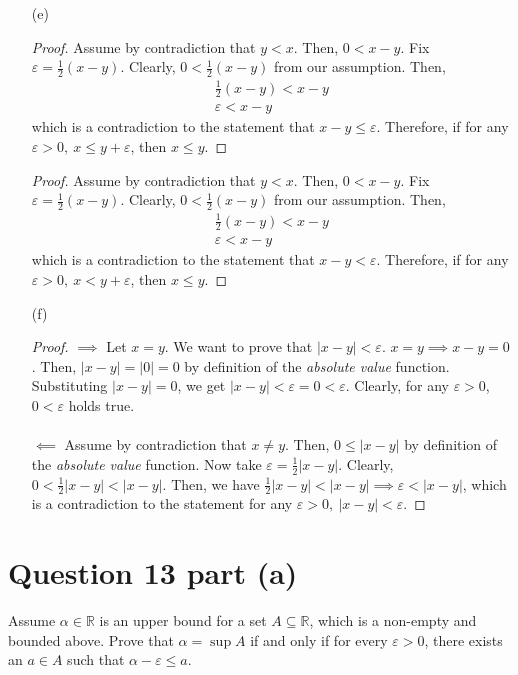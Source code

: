 \documentclass[13pt]{article}
\begin{document}
\begin{enumerate}
\item [(e)]
  \begin{proof}
    Assume by contradiction that $y < x$. Then, $0 < x - y$. Fix $\varepsilon = \frac{1}{2}(x - y)$.
    Clearly, $0 < \frac{1}{2}(x - y)$ from our assumption. Then,
    \begin{align*}
      \frac{1}{2}(x - y) < x - y \\
      \varepsilon < x - y
    \end{align*}
    which is a contradiction to the statement that $x - y \leq \varepsilon$. Therefore, if for any
    $\varepsilon > 0, \ x \leq y + \varepsilon$, then $x \leq y$.
  \end{proof}
  \begin{proof}
    Assume by contradiction that $y < x$. Then, $0 < x - y$. Fix $\varepsilon = \frac{1}{2}(x - y)$.
    Clearly, $0 < \frac{1}{2}(x - y)$ from our assumption. Then,
    \begin{align*}
      \frac{1}{2}(x - y) < x - y \\
      \varepsilon < x - y
    \end{align*}
    which is a contradiction to the statement that $x - y < \varepsilon$. Therefore, if for any
    $\varepsilon > 0, \ x < y + \varepsilon$, then $x \leq y$.
  \end{proof}

\item [(f)]
  \begin{proof}
    $\implies$ Let $x = y$. We want to prove that $|x - y| < \varepsilon$. $x = y \implies x - y = 0$.
    Then, $|x - y| = |0| = 0$ by definition of the \textit{absolute value} function. Substituting $|x - y| = 0$,
    we get $|x - y| < \varepsilon = 0 < \varepsilon$. Clearly, for any $\varepsilon > 0$, $0 < \varepsilon$ holds
    true. \\ \\
    $\impliedby$ Assume by contradiction that $x \neq y$. Then, $0 \leq |x - y|$ by definition of the
    \textit{absolute value} function. Now take $\varepsilon = \frac{1}{2}|x - y|$. Clearly, $0 < \frac{1}{2}
    |x - y| < |x - y|$. Then, we have $\frac{1}{2}|x - y| < |x - y| \implies \varepsilon < |x - y|$, which
    is a contradiction to the statement for any $\varepsilon > 0, \ |x - y| < \varepsilon$.
  \end{proof}
\end{enumerate}

\newpage
\section*{Question 13 part (a)}
Assume $\alpha \in \mathbb{R}$ is an upper bound for a set $A \subseteq \mathbb{R}$, which is a
non-empty and bounded above. Prove that $\alpha = \sup{A}$ if and only if for every $\varepsilon
> 0$, there exists an $a \in A$ such that $\alpha - \varepsilon \leq a$.
\end{document}

